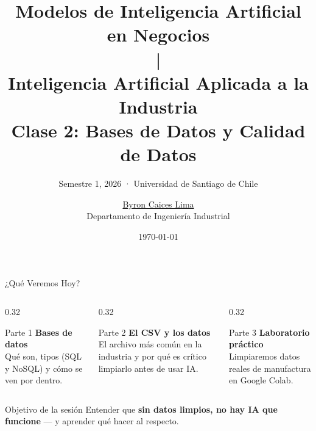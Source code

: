 \documentclass[aspectratio=169]{beamer}
\title{Modelos de Inteligencia Artificial en Negocios\\{\normalsize |}\\ Inteligencia Artificial Aplicada a la Industria\\{\tiny Clase 2: Bases de Datos y Calidad de Datos}}
\subtitle{{\small Semestre 1, 2026 · Universidad de Santiago de Chile}}
\author{\href{https://www.linkedin.com/in/byron-caices/}{Byron Caices Lima} \\ \small Departamento de Ingeniería Industrial}
\date{\today}
\begin{document}
\maketitle


\begin{frame}{¿Qué Veremos Hoy?}
  \small
  \begin{columns}[T]
    \begin{column}{0.32\textwidth}
      \begin{conceptbox}{\faDatabase\enspace Parte 1}
        \small
        \textbf{Bases de datos}\\[4pt]
        Qué son, tipos (SQL y NoSQL) y cómo se ven por dentro.
      \end{conceptbox}
    \end{column}
    \begin{column}{0.32\textwidth}
      \begin{conceptbox}{\faFileCsv\enspace Parte 2}
        \small
        \textbf{El CSV y los datos}\\[4pt]
        El archivo más común en la industria y por qué es crítico limpiarlo antes de usar IA.
      \end{conceptbox}
    \end{column}
    \begin{column}{0.32\textwidth}
      \begin{conceptbox}{\faFlask\enspace Parte 3}
        \small
        \textbf{Laboratorio práctico}\\[4pt]
        Limpiaremos datos reales de manufactura en Google Colab.
      \end{conceptbox}
    \end{column}
  \end{columns}
  \vspace{0.3cm}
  \begin{alertblock}{\faLightbulb\enspace Objetivo de la sesión}
    \centering\small
    Entender que \textbf{sin datos limpios, no hay IA que funcione} --- y aprender qué hacer al respecto.
  \end{alertblock}
\end{frame}

\end{document}
